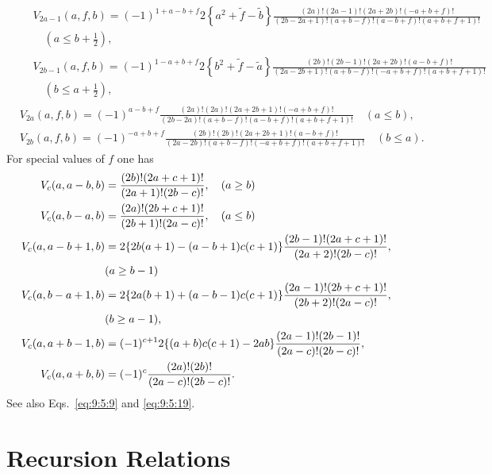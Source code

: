 \begin{align}
  & \begin{aligned}
& V_{2 a-1}(a, f, b)=(-1)^{1+a-b+f} 2\left\{a^{2}+\tilde{f}-\tilde{b}\right\} \frac{(2 a)!(2 a-1)!(2 a+2 b)!(-a+b+f)!}{(2 b-2 a+1)!(a+b-f)!(a-b+f)!(a+b+f+1)!} \\
& \quad\left(a \leq b+\frac{1}{2}\right),
\end{aligned}  \label{eq:9:5:29}\\
& \begin{aligned}
& V_{2 b-1}(a, f, b)=(-1)^{1-a+b+f} 2\left\{b^{2}+\tilde{f}-\tilde{a}\right\} \frac{(2 b)!(2 b-1)!(2 a+2 b)!(a-b+f)!}{(2 a-2 b+1)!(a+b-f)!(-a+b+f)!(a+b+f+1)!} \\
& \quad\left(b \leq a+\frac{1}{2}\right),
\end{aligned}  \label{eq:9:5:30}\\
& V_{2 a}(a, f, b)=(-1)^{a-b+f} \frac{(2 a)!(2 a)!(2 a+2 b+1)!(-a+b+f)!}{(2 b-2 a)!(a+b-f)!(a-b+f)!(a+b+f+1)!} \quad(a \leq b),  \label{eq:9:5:31}\\
& V_{2 b}(a, f, b)=(-1)^{-a+b+f} \frac{(2 b)!(2 b)!(2 a+2 b+1)!(a-b+f)!}{(2 a-2 b)!(a+b-f)!(-a+b+f)!(a+b+f+1)!} \quad(b \leq a). \label{eq:9:5:32}
\end{align}
For special values of $f$ one has
\begin{align}
 V_{c}(a, a-b, b)&=\frac{(2 b)!(2 a+c+1)!}{(2 a+1)!(2 b-c)!}, \quad(a \geq b)  \label{eq:9:5:33}\\
 V_{c}(a, b-a, b)&=\frac{(2 a)!(2 b+c+1)!}{(2 b+1)!(2 a-c)!}, \quad(a \leq b)  \label{eq:9:5:34}\\
 V_{c}(a, a-b+1, b)&=2\{2 b(a+1)-(a-b+1) c(c+1)\} \frac{(2 b-1)!(2 a+c+1)!}{(2 a+2)!(2 b-c)!},  \label{eq:9:5:35}\\
&(a \geq b-1)  \notag\\
 V_{c}(a, b-a+1, b)&=2\{2 a(b+1)+(a-b-1) c(c+1)\} \frac{(2 a-1)!(2 b+c+1)!}{(2 b+2)!(2 a-c)!},  \label{eq:9:5:36}\\
&(b \geq a-1),  \notag\\
 V_{c}(a, a+b-1, b)&=(-1)^{c+1} 2\{(a+b) c(c+1)-2 a b\} \frac{(2 a-1)!(2 b-1)!}{(2 a-c)!(2 b-c)!},  \label{eq:9:5:37}\\
 V_{c}(a, a+b, b)&=(-1)^{c} \frac{(2 a)!(2 b)!}{(2 a-c)!(2 b-c)!}. \label{eq:9:5:38}
\end{align}
See also Eqs.~\eqref{eq:9:5:9} and \eqref{eq:9:5:19}.

\section{Recursion Relations}\label{sec:9.6}

